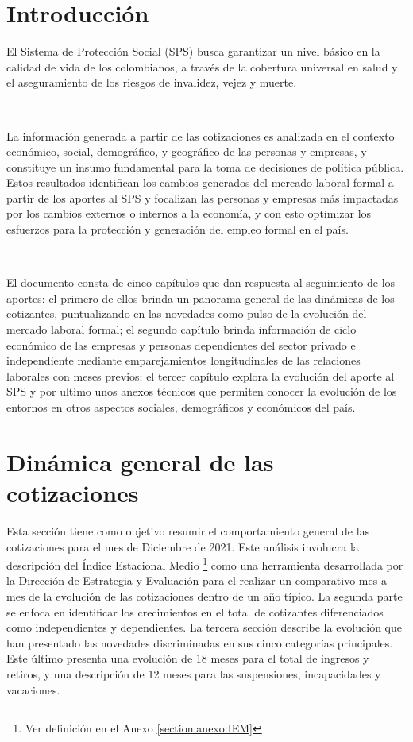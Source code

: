 \section{Introducción}

El Sistema de Protección Social (SPS) busca garantizar un nivel básico en la calidad de vida de los colombianos, a través de la cobertura universal en salud y el aseguramiento de los riesgos de invalidez, vejez y muerte. 

\

La información generada a partir de las cotizaciones es analizada en el contexto económico, social, demográfico, y geográfico de las personas y empresas, y constituye un insumo fundamental para la toma de decisiones de política pública.  Estos resultados identifican los cambios generados del mercado laboral formal a partir de los aportes al SPS y focalizan las personas y empresas más impactadas por los cambios externos o internos a la economía, y con esto optimizar los esfuerzos para la protección y generación del empleo formal en el país. 

\

El documento consta de cinco capítulos que dan respuesta al seguimiento de los aportes: el primero de ellos brinda un panorama general de las dinámicas de los cotizantes, puntualizando en las novedades como pulso de la evolución del mercado laboral formal; el segundo capítulo brinda información de ciclo económico de las empresas y personas dependientes del sector privado e independiente mediante emparejamientos longitudinales de las relaciones laborales con meses previos; el tercer capítulo explora la evolución del aporte al SPS y por ultimo unos anexos técnicos que permiten conocer la evolución de los entornos en otros aspectos sociales, demográficos y económicos del país. 
 
\section{Dinámica general de las cotizaciones}

Esta sección tiene como objetivo resumir el comportamiento general de las cotizaciones para el mes de Diciembre de 2021. Este análisis involucra la descripción del Índice Estacional Medio \footnote{Ver definición en el Anexo \ref{section:anexo:IEM}} como una herramienta desarrollada por la Dirección de Estrategia y Evaluación para el realizar un comparativo mes a mes de la evolución de las cotizaciones dentro de un año típico. La segunda parte se enfoca en identificar los crecimientos en el total de cotizantes diferenciados como independientes y dependientes. La tercera sección describe la evolución que han presentado las novedades discriminadas en sus cinco categorías principales. Este último presenta una evolución de 18 meses para el total de ingresos y retiros, y una descripción de 12 meses para las suspensiones, incapacidades y vacaciones.

